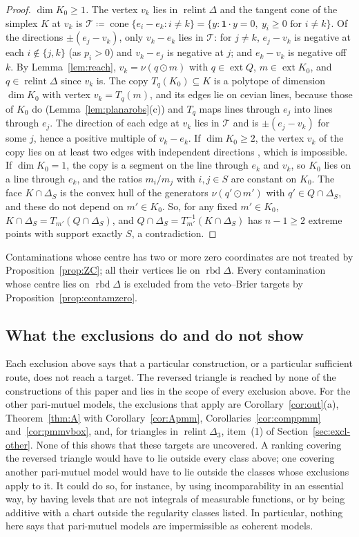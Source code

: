 \documentclass[11pt]{article}
\newcommand{\one}{\mathbf{1}}
\DeclareMathOperator{\cone}{cone}
\DeclareMathOperator{\relint}{relint}
\DeclareMathOperator{\rbd}{rbd}
\DeclareMathOperator{\ext}{ext}
\theoremstyle{plain}
\theoremstyle{definition}
\theoremstyle{remark}
\begin{document}
\begin{proof}
\emph{$\dim K_0\ge1$.} The vertex $v_k$ lies in $\relint\Delta$ and the tangent cone of the
simplex $K$ at $v_k$ is $\mathcal T\coloneqq\cone\{e_i-e_k:i\ne k\}=\{y:\one\cdot y=0,\ y_i\ge0
\text{ for }i\ne k\}$. Of the directions $\pm(e_j-v_k)$, only $v_k-e_k$ lies in $\mathcal T$: for
$j\ne k$, $e_j-v_k$ is negative at each $i\notin\{j,k\}$ (as $p_i>0$) and $v_k-e_j$ is
negative at $j$; and $e_k-v_k$ is negative off $k$. By Lemma~\ref{lem:reach},
$v_k=\nu(q\odot m)$ with $q\in\ext Q$, $m\in\ext K_0$, and $q\in\relint\Delta$ since $v_k$
is. The copy $T_q(K_0)\subseteq K$ is a polytope of dimension $\dim K_0$ with vertex
$v_k=T_q(m)$, and its edges lie on cevian lines, because those of $K_0$ do
(Lemma~\ref{lem:planarobs}(c)) and $T_q$ maps lines through $e_j$ into lines through
$e_j$. The direction of each edge at $v_k$ lies in $\mathcal T$ and is $\pm(e_j-v_k)$ for some $j$,
hence a positive multiple of $v_k-e_k$. If $\dim K_0\ge2$, the vertex $v_k$ of the copy
lies on at least two edges with independent directions \cite{Ziegler}, which is impossible.
If $\dim K_0=1$, the copy is a segment on the line through $e_k$ and $v_k$, so $K_0$ lies
on a line through $e_k$, and the ratios $m_i/m_j$ with $i,j\in S$ are constant on $K_0$.
The face $K\cap\Delta_S$ is the convex hull of the generators $\nu(q'\odot m')$ with
$q'\in Q\cap\Delta_S$, and these do not depend on $m'\in K_0$. So, for any fixed
$m'\in K_0$, $K\cap\Delta_S=T_{m'}(Q\cap\Delta_S)$, and $Q\cap\Delta_S=T_{m'}^{-1}(K\cap
\Delta_S)$ has $n-1\ge2$ extreme points with support exactly $S$, a contradiction.
\end{proof}

Contaminations whose centre has two or more zero coordinates are not treated by
Proposition~\ref{prop:ZC}; all their vertices lie on $\rbd\Delta$. Every contamination
whose centre lies on $\rbd\Delta$ is excluded from the veto--Brier targets by
Proposition~\ref{prop:contamzero}.

\subsection{What the exclusions do and do not show}

Each exclusion above says that a particular construction, or a particular sufficient
route, does not reach a target. The reversed triangle is reached by none of the
constructions of this paper and lies in the scope of every exclusion above. For the other
pari-mutuel models, the exclusions that apply are Corollary~\ref{cor:out}(a),
Theorem~\ref{thm:A} with Corollary~\ref{cor:Apmm}, Corollaries~\ref{cor:comppmm}
and~\ref{cor:pmmvbox}, and, for triangles in $\relint\Delta_3$, item~(1) of
Section~\ref{sec:excl-other}. None of this shows that these targets are uncovered. A ranking
covering the reversed triangle would have to lie outside every class above; one covering
another pari-mutuel model would have to lie outside the classes whose exclusions apply to
it. It could do so, for instance, by using incomparability in an essential way, by having
levels that are not integrals of measurable functions, or by being additive with a chart
outside the regularity classes listed. In particular, nothing here says that
pari-mutuel models are impermissible as coherent models.
\end{document}
